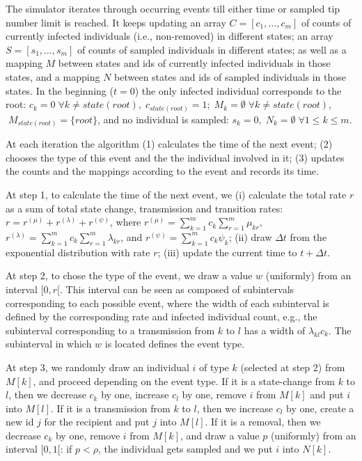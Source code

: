 \documentclass[10pt,letterpaper]{article}
\begin{document}
The simulator iterates through occurring events till either time or sampled tip number limit is reached. 
It keeps updating an array $C = [c_1, \ldots, c_m]$ of counts of currently infected individuals (i.e., non-removed) in different states; an array $S = [s_1, \ldots, s_m]$ of counts of sampled individuals in different states; as well as a mapping $M$ between states and ids of currently infected individuals in those states, and a mapping $N$ between states and ids of sampled individuals in those states.  In the beginning ($t=0$) the only infected individual corresponds to the root: $c_k = 0 \;\forall k \neq state(root), \;c_{state(root)} = 1; \;M_k = \emptyset \; \forall k \neq state(root)$, $ \; M_{state(root)} = \{root\}$, and no individual is sampled: $s_k=0,\;N_k = \emptyset \; \forall 1 \leq k \leq m$.

At each iteration the algorithm (1) calculates the time of the next event; (2) chooses the type of this event and the the individual involved in it; (3) updates the counts and the mappings according to the event and records its time.

At step 1, to calculate the time of the next event, we (i) calculate the total rate $r$ as a sum of total state change, transmission and transition rates: $r = r^{(\mu)} + r^{(\lambda)} + r^{(\psi)}$, where $r^{(\mu)} = \sum\limits_{k=1}^{m} c_k \sum\limits_{r=1}^{m} \mu_{kr}$, $r^{(\lambda)} = \sum\limits_{k=1}^{m} c_k \sum\limits_{r=1}^{m} \lambda_{kr}$, and $r^{(\psi)} = \sum\limits_{k=1}^{m} c_k \psi_{k}$; (ii) draw $\Delta t$ from the exponential distribution with rate $r$; (iii) update the current time to $t + \Delta t$.

At step 2, to chose the type of the event, we draw a value $w$ (uniformly) from an interval $[0, r[$. This interval can be seen as composed of subintervals corresponding to each possible event, where the width of each subinterval is defined by the corresponding rate and infected individual count, e.g., the subinterval corresponding to a transmission from $k$ to $l$ has a width of $\lambda_{kl}c_k$. The subinterval in which $w$ is located defines the event type.

At step 3, we randomly draw an individual $i$ of type $k$ (selected at step 2) from $M[k]$, and proceed depending on the event type. If it is a state-change from $k$ to $l$, then we decrease $c_k$ by one, increase $c_l$ by one, remove $i$ from $M[k]$ and put $i$ into $M[l]$. If it is a transmission from $k$ to $l$, then we increase $c_l$ by one, create a new id $j$ for the recipient and put $j$ into $M[l]$. If it is a removal, then we decrease $c_k$ by one, remove $i$ from $M[k]$, and draw a value $p$ (uniformly) from an interval $[0, 1[$: if $p < \rho$, the individual gets sampled and we put $i$ into $N[k]$. 
\end{document}
